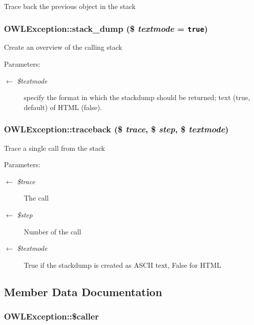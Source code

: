 Trace back the previous object in the stack \hypertarget{classOWLException_cf2b94859fdebcefc22e8a75ac1a670d}{
\subsubsection{\setlength{\rightskip}{0pt plus 5cm}OWLException::stack\_\-dump (\$ {\em textmode} = {\tt true})}}
\label{classOWLException_cf2b94859fdebcefc22e8a75ac1a670d}


Create an overview of the calling stack

\begin{Desc}
\item[Parameters:]
\begin{description}
\item[\mbox{$\leftarrow$} {\em \$textmode}]specify the format in which the stackdump should be returned; text (true, default) of HTML (false). \end{description}
\end{Desc}
\hypertarget{classOWLException_6e857cc079ee29428791e4926fe1677a}{
\subsubsection{\setlength{\rightskip}{0pt plus 5cm}OWLException::traceback (\$ {\em trace}, \$ {\em step}, \$ {\em textmode})}}
\label{classOWLException_6e857cc079ee29428791e4926fe1677a}


Trace a single call from the stack

\begin{Desc}
\item[Parameters:]
\begin{description}
\item[\mbox{$\leftarrow$} {\em \$trace}]The call \item[\mbox{$\leftarrow$} {\em \$step}]Number of the call \item[\mbox{$\leftarrow$} {\em \$textmode}]True if the stackdump is created as ASCII text, False for HTML \end{description}
\end{Desc}


\subsection{Member Data Documentation}
\hypertarget{classOWLException_f59d0890c1de1187f43084ec617545f1}{
\subsubsection{\setlength{\rightskip}{0pt plus 5cm}OWLException::\$caller}}
\label{classOWLException_f59d0890c1de1187f43084ec617545f1}


